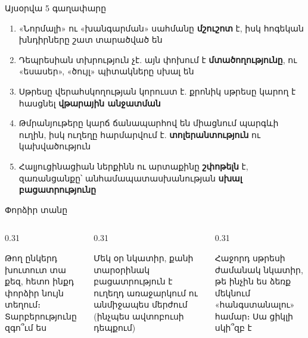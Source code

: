\notopic

\begin{frame}{Այսօրվա 5 գաղափարը}
  \begin{enumerate}
    \item<1-> «Նորմալի» ու «խանգարման» սահմանը \textbf{մշուշոտ} է, իսկ հոգեկան խնդիրները շատ տարածված են
    \item<2-> Դեպրեսիան տխրություն չէ. այն փոխում է \textbf{մտածողությունը}, ու «եսասեր», «ծույլ» պիտակները սխալ են
    \item<3-> Սթրեսը վերահսկողության կորուստ է. քրոնիկ սթրեսը կարող է հասցնել \textbf{վթարային անջատման}
    \item<4-> Թմրանյութերը կարճ ճանապարհով են միացնում պարգևի ուղին, իսկ ուղեղը հարմարվում է. \textbf{տոլերանտություն} ու կախվածություն
    \item<5-> Հալյուցինացիան ներքինն ու արտաքինը \textbf{շփոթելն} է, զառանցանքը՝ անհամապատասխանության \textbf{սխալ բացատրությունը}
  \end{enumerate}
\end{frame}

\begin{frame}{Փորձիր տանը}
  \begin{columns}[T]
    \begin{column}{0.31\textwidth}
      \begin{card}[colback=mint!30!cardwhite]
        \centering{}\par\smallskip
        \raggedright Թող ընկերդ խուտուտ տա քեզ, հետո ինքդ փորձիր նույն տեղում։ Տարբերությունը զգո՞ւմ ես
      \end{card}
    \end{column}
    \begin{column}{0.31\textwidth}
      \begin{card}[colback=lavender!35!cardwhite]
        \centering{}\par\smallskip
        \raggedright Մեկ օր նկատիր, քանի տարօրինակ բացատրություն է ուղեղդ առաջարկում ու անմիջապես մերժում (ինչպես ավտոբուսի դեպքում)
      \end{card}
    \end{column}
    \begin{column}{0.31\textwidth}
      \begin{card}[colback=peach!35!cardwhite]
        \centering{}\par\smallskip
        \raggedright Հաջորդ սթրեսի ժամանակ նկատիր, թե ինչին ես ձեռք մեկնում «հանգստանալու» համար։ Սա ցիկլի սկի՞զբ է
      \end{card}
    \end{column}
  \end{columns}
\end{frame}

